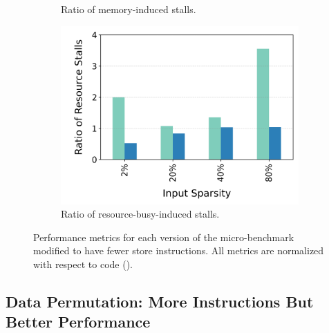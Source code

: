 \begin{figure}[t]
\begin{subfigure}{.33\textwidth}
    \caption{Ratio of memory-induced stalls.}
    \label{fig:single-if-few-scatter-mem-stalls}
  \end{subfigure}
    \begin{subfigure}{.33\textwidth}
        \centering
    \includegraphics[width=\textwidth]{Figures/Evaluations/single_if_few_scatter_resource_stalls.png}
    \caption{Ratio of resource-busy-induced stalls.}
    \label{fig:single-if-few-scatter-resource-stalls}
  \end{subfigure}
  
  \caption{Performance metrics for each version of the \ifThenBench micro-benchmark modified to have fewer store instructions. All metrics are normalized with respect to \ifconverted code (\ifconv).}
  \label{fig:single-if-few-scatter}
\end{figure}

\subsection{Data Permutation: More Instructions But Better Performance}
\label{sec:data-permutation-evaluation}


